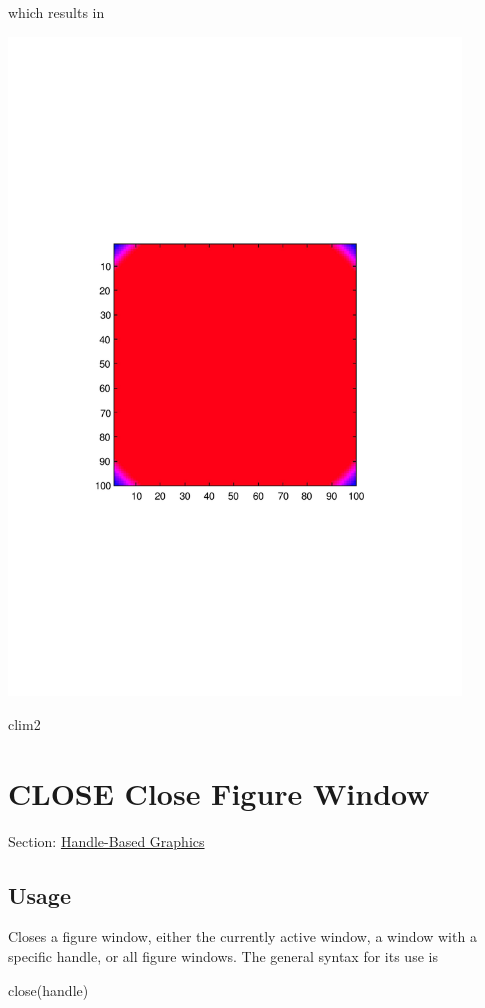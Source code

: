 which results in  
\begin{DoxyImage}
\includegraphics[width=12cm]{clim2}
\caption{clim2}
\end{DoxyImage}
 \hypertarget{handle_close}{}\section{C\-L\-O\-S\-E Close Figure Window}\label{handle_close}
Section\-: \hyperlink{sec_handle}{Handle-\/\-Based Graphics} \hypertarget{vtkwidgets_vtkxyplotwidget_Usage}{}\subsection{Usage}\label{vtkwidgets_vtkxyplotwidget_Usage}
Closes a figure window, either the currently active window, a window with a specific handle, or all figure windows. The general syntax for its use is \begin{DoxyVerb}   close(handle)
\end{DoxyVerb}
